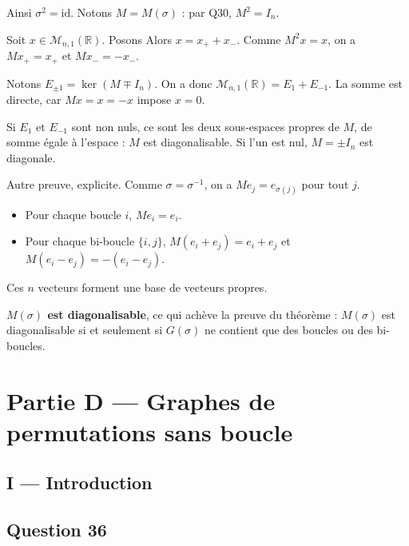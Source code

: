 \documentclass[11pt,a4paper]{article}
\providecommand{\tightlist}{\setlength{\itemsep}{0pt}\setlength{\parskip}{0pt}}
\newcommand{\equationajustee}[1]{%
  \sbox{\boiteequation}{$\displaystyle #1$}%
  \ifdim\wd\boiteequation>\linewidth
    \[\resizebox{\linewidth}{!}{\usebox{\boiteequation}}\]%
  \else
    \[#1\]%
  \fi}
\begin{document}
Ainsi \(\sigma^2=\mathrm{id}\). Notons \(M=M(\sigma)\) : par Q30, \(M^2=I_n\).

Soit \(x\in\mathcal M_{n,1}(\mathbb R)\). Posons
\equationajustee{\begin{aligned}
x_+&=\frac{x+Mx}2,\\
x_-&=\frac{x-Mx}2.
\end{aligned}}
Alors \(x=x_++x_-\). Comme \(M^2x=x\), on a \(Mx_+=x_+\) et \(Mx_-=-x_-\).

Notons \(E_{\pm1}=\ker(M\mp I_n)\). On a donc \(\mathcal M_{n,1}(\mathbb R)=E_1+E_{-1}\). La somme est directe, car \(Mx=x=-x\) impose \(x=0\).

Si \(E_1\) et \(E_{-1}\) sont non nuls, ce sont les deux sous-espaces propres de \(M\), de somme égale à l'espace : \(M\) est diagonalisable. Si l'un est nul, \(M=\pm I_n\) est diagonale.

Autre preuve, explicite. Comme \(\sigma=\sigma^{-1}\), on a \(Me_j=e_{\sigma(j)}\) pour tout \(j\).

\begin{itemize}
\tightlist
\item
  Pour chaque boucle \(i\), \(Me_i=e_i\).
\item
  Pour chaque bi-boucle \(\{i,j\}\), \(M(e_i+e_j)=e_i+e_j\) et \(M(e_i-e_j)=-(e_i-e_j)\).
\end{itemize}

Ces \(n\) vecteurs forment une base de vecteurs propres.

\textbf{\(M(\sigma)\) est diagonalisable}, ce qui achève la preuve du théorème : \(M(\sigma)\) est diagonalisable si et seulement si \(G(\sigma)\) ne contient que des boucles ou des bi-boucles.

\hypertarget{partie-d-graphes-de-permutations-sans-boucle}{%
\section{Partie D --- Graphes de permutations sans boucle}\label{partie-d-graphes-de-permutations-sans-boucle}}

\hypertarget{i-introduction}{%
\subsection{I --- Introduction}\label{i-introduction}}

\hypertarget{question-36}{%
\subsection{Question 36}\label{question-36}}
\end{document}

